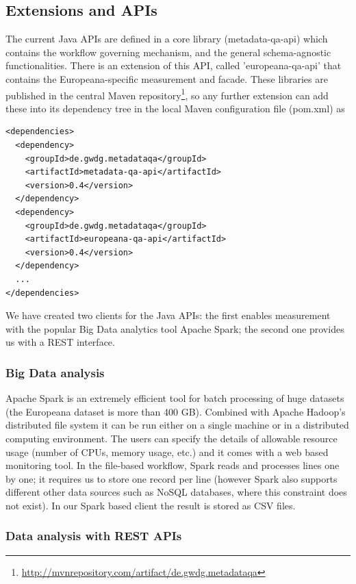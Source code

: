 \subsection{Extensions and APIs}

The current Java APIs are defined in a core library (metadata-qa-api) which contains the workflow governing mechanism, and the general schema-agnostic functionalities. There is an extension of this API, called 'europeana-qa-api' that contains the Europeana-specific measurement and facade. These libraries are published in the central Maven repository\footnote{\url{http://mvnrepository.com/artifact/de.gwdg.metadataqa}}, so any further extension can add these into its dependency tree in the local Maven configuration file (pom.xml) as

\begin{lstlisting}[caption=Including the Java libraries into other project]
<dependencies>
  <dependency>
    <groupId>de.gwdg.metadataqa</groupId>
    <artifactId>metadata-qa-api</artifactId>
    <version>0.4</version>
  </dependency>
  <dependency>
    <groupId>de.gwdg.metadataqa</groupId>
    <artifactId>europeana-qa-api</artifactId>
    <version>0.4</version>
  </dependency>
  ...
</dependencies>
\end{lstlisting}

We have created two clients for the Java APIs: the first enables measurement with the popular Big Data analytics tool Apache Spark; the second one provides us with a REST interface.

\subsubsection{Big Data analysis}

Apache Spark is an extremely efficient tool for batch processing of huge datasets (the Europeana dataset is more than 400 GB). Combined with Apache Hadoop's distributed file system it can be run either on a single machine or in a distributed computing environment. The users can specify the details of allowable resource usage (number of CPUs, memory usage, etc.) and it comes with a web based monitoring tool. In the file-based workflow, Spark reads and processes lines one by one; it requires us to store one record per line (however Spark also supports different other data sources such as NoSQL databases, where this constraint does not exist). In our Spark based client the result is stored as CSV files.

\subsubsection{Data analysis with REST APIs}

